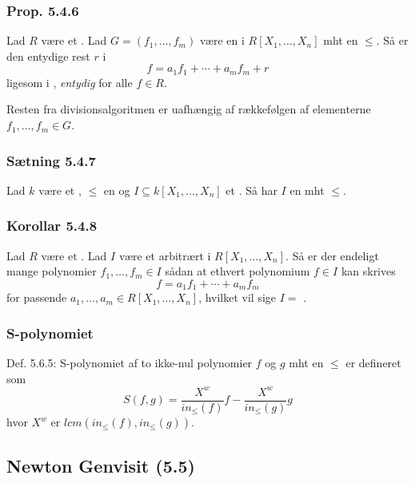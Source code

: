 \subsubsection{Prop. 5.4.6}
\label{Prop. 5.4.6}
Lad $R$ være et . Lad $G = (f_1, \ldots, f_m)$ være en
 i $R[X_1,\ldots,X_n]$ mht en 
$\leq$. Så er den entydige rest $r$ i
\begin{equation*}
  f = a_1 f_1 + \cdots + a_m f_m + r
\end{equation*}
ligesom i , \textit{entydig} for alle $f \in R$.

Resten fra divisionsalgoritmen er uafhængig af rækkefølgen af elementerne $f_1,
\ldots, f_m \in G$.

\subsubsection{Sætning 5.4.7}
\label{Saetning 5.4.7}
Lad $k$ være et , $\leq$ en  og $I
\subseteq k[X_1,\ldots,X_n]$ et . Så har $I$ en
 mht $\leq$.

\subsubsection{Korollar 5.4.8}
\label{Korollar 5.4.8}
Lad $R$ være et . Lad $I$ være et arbitrært  i
$R[X_1,\ldots,X_n]$. Så er der endeligt mange polynomier $f_1,\ldots,f_m \in I$
sådan at ethvert polynomium $f \in I$ kan skrives
\begin{equation*}
  f = a_1 f_1 + \cdots + a_m f_m
\end{equation*}
for passende $a_1,\ldots,a_m \in R[X_1,\ldots,X_n]$, hvilket vil sige $I =$
.

\subsubsection{S-polynomiet}
\label{S-polynomiet}
Def. 5.6.5: S-polynomiet af to ikke-nul polynomier $f$ og $g$ mht en
 $\leq$ er defineret som
\begin{equation*}
  S(f,g) = \frac{X^w}{in_{\leq}(f)}f - \frac{X^w}{in_{\leq}(g)}g
\end{equation*}
hvor $X^w$ er $lcm(in_{\leq}(f), in_{\leq}(g))$.

\subsection{Newton Genvisit (5.5)}
\label{Newton Genvisit (5.5)}
